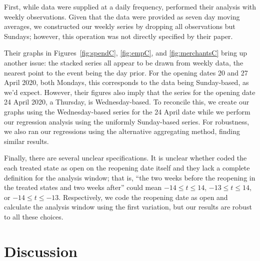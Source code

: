 \documentclass[12pt,letterpaper]{article}
\begin{document}
First, while data were supplied at a daily frequency, \citeauthor{Chetty2020} performed their analysis with weekly observations. Given that the data were provided as seven day moving averages, we constructed our weekly series by dropping all observations but Sundays; however, this operation was not directly specified by their paper. 

Their graphs in Figures~\ref{fig:spendC}, \ref{fig:empC}, and \ref{fig:merchantsC} bring up another issue: the stacked series all appear to be drawn from weekly data, the nearest point to the event being the day prior. For the opening dates 20 and 27 April 2020, both Mondays, this corresponds to the data being Sunday-based, as we’d expect. However, their figures also imply that the series for the opening date 24 April 2020, a Thursday, is Wednesday-based. To reconcile this, we create our graphs using the Wednesday-based series for the 24 April date while we perform our regression analysis using the uniformly Sunday-based series. For robustness, we also ran our regressions using the alternative aggregating method, finding similar results.

Finally, there are several unclear specifications. It is unclear whether \citeauthor{Chetty2020} coded the each treated state as open on the reopening date itself and they lack a complete definition for the analysis window; that is, “the two weeks before the reopening in the treated states and two weeks after” could mean $-14 \le t \le 14$, $-13 \le t \le14$, or $-14 \le t \le -13$. Respectively, we code the reopening date as open and calculate the analysis window using the first variation, but our results are robust to all these choices.
\section*{Discussion}

\printbibliography
\end{document}
